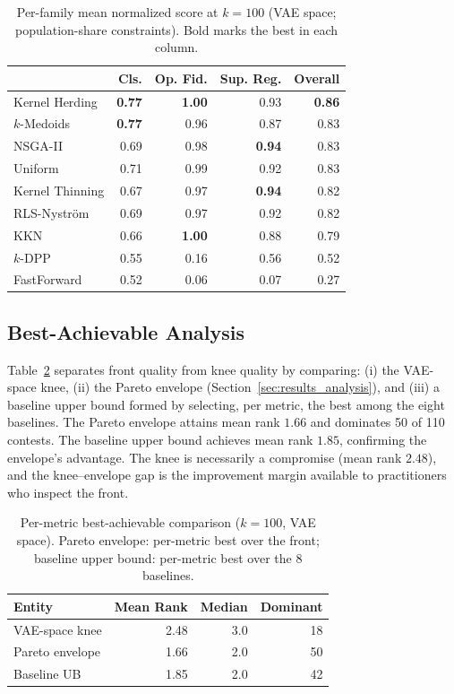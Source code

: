 \documentclass[10pt,journal]{IEEEtran}
\newcommand{\1}{\mathbf{1}}
\theoremstyle{ieeethm}
\begin{document}
\begin{table}[t]
\centering
\caption{Per-family mean normalized score at $k=100$ (VAE space; population-share constraints). Bold marks the best in each column.}
\label{tab:championship_families}
\small
\begin{tabular}{@{}l r r r r@{}}
\toprule
& Cls. & Op. Fid. & Sup. Reg. & Overall \\
\midrule
Kernel Herding & \textbf{0.77} & \textbf{1.00} & 0.93 & \textbf{0.86} \\
$k$-Medoids & \textbf{0.77} & 0.96 & 0.87 & 0.83 \\
NSGA-II & 0.69 & 0.98 & \textbf{0.94} & 0.83 \\
Uniform & 0.71 & 0.99 & 0.92 & 0.83 \\
Kernel Thinning & 0.67 & 0.97 & \textbf{0.94} & 0.82 \\
RLS-Nyström & 0.69 & 0.97 & 0.92 & 0.82 \\
KKN & 0.66 & \textbf{1.00} & 0.88 & 0.79 \\
$k$-DPP & 0.55 & 0.16 & 0.56 & 0.52 \\
FastForward & 0.52 & 0.06 & 0.07 & 0.27 \\
\bottomrule
\end{tabular}
\end{table}

\subsection{Best-Achievable Analysis}
\label{subsec:q_best_achievable}

Table~\ref{tab:best_achievable} separates front quality from knee quality by comparing: (i) the VAE-space knee, (ii) the Pareto envelope (Section~\ref{sec:results_analysis}), and (iii) a baseline upper bound formed by selecting, per metric, the best among the eight baselines. The Pareto envelope attains mean rank $1.66$ and dominates 50 of 110 contests. The baseline upper bound achieves mean rank $1.85$, confirming the envelope's advantage. The knee is necessarily a compromise (mean rank $2.48$), and the knee--envelope gap is the improvement margin available to practitioners who inspect the front.

\begin{table}[t]
\centering
\caption{Per-metric best-achievable comparison ($k=100$, VAE space). Pareto envelope: per-metric best over the front; baseline upper bound: per-metric best over the 8 baselines.}
\label{tab:best_achievable}
\small
\begin{tabular}{@{}l r r r@{}}
\toprule
Entity & Mean Rank & Median & Dominant \\
\midrule
VAE-space knee   & 2.48 & 3.0 & 18  \\
Pareto envelope  & 1.66 & 2.0 & 50 \\
Baseline UB      & 1.85 & 2.0 & 42 \\
\bottomrule
\end{tabular}
\end{table}
\end{document}
